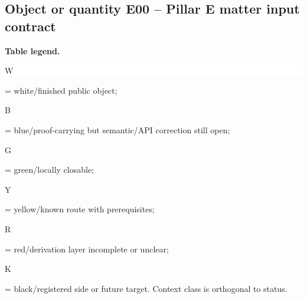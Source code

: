 \subsection*{Object or quantity E00 -- Pillar E matter input contract}
\hypertarget{objproof:E00}{}
\par\smallskip\noindent\begin{minipage}{0.99\linewidth}\footnotesize\raggedright\textbf{Table legend.} \colorbox{white}{\strut W} = white/finished public object; \colorbox{cyan!20}{\strut B} = blue/proof-carrying but semantic/API correction still open; \colorbox{green!18}{\strut G} = green/locally closable; \colorbox{yellow!25}{\strut Y} = yellow/known route with prerequisites; \colorbox{red!20}{\strut R} = red/derivation layer incomplete or unclear; \colorbox{black!18}{\strut K} = black/registered side or future target. Context class is orthogonal to status.\end{minipage}\par\vspace{0.25em}
